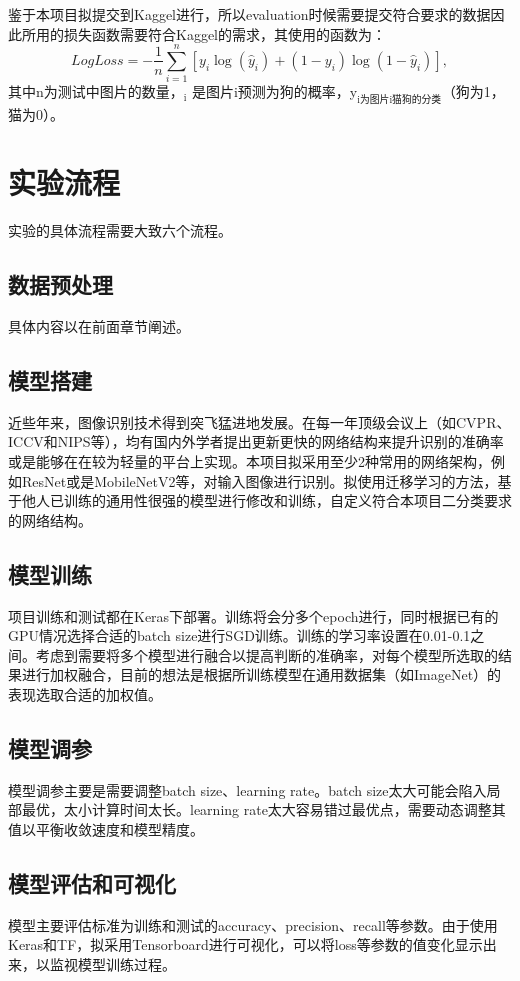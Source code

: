 \documentclass[a4paper,11pt]{article}
\begin{document}
鉴于本项目拟提交到Kaggel进行，所以evaluation时候需要提交符合要求的数据因此所用的损失函数需要符合Kaggel的需求，其使用的函数为：
\begin{equation}
\label{eq:kaggelE}
LogLoss = -\frac{1}{n}\sum_{i=1}^{n}[y_i\log{(\hat{y}_i)}+(1-y_i)\log{(1-\hat{y}_i)}],
\end{equation}
其中n为测试中图片的数量，\(_{\text{i}}\) 是图片i预测为狗的概率，y\(_{\text{i为图片i猫狗的分类}}\)（狗为1，猫为0）。

\section{实验流程}
\label{sec:orgd7a83e8}
实验的具体流程需要大致六个流程。
\subsection{数据预处理}
\label{sec:org98086fe}
具体内容以在前面章节阐述。
\subsection{模型搭建}
\label{sec:orga35ff75}
近些年来，图像识别技术得到突飞猛进地发展。在每一年顶级会议上（如CVPR、ICCV和NIPS等），均有国内外学者提出更新更快的网络结构来提升识别的准确率或是能够在在较为轻量的平台上实现。本项目拟采用至少2种常用的网络架构，例如ResNet或是MobileNetV2等，对输入图像进行识别。拟使用迁移学习的方法，基于他人已训练的通用性很强的模型进行修改和训练，自定义符合本项目二分类要求的网络结构。
\subsection{模型训练}
\label{sec:orga912f23}
项目训练和测试都在Keras下部署。训练将会分多个epoch进行，同时根据已有的GPU情况选择合适的batch size进行SGD训练。训练的学习率设置在0.01-0.1之间。考虑到需要将多个模型进行融合以提高判断的准确率，对每个模型所选取的结果进行加权融合，目前的想法是根据所训练模型在通用数据集（如ImageNet）的表现选取合适的加权值。
\subsection{模型调参}
\label{sec:org6d2ebe4}
模型调参主要是需要调整batch size、learning rate。batch size太大可能会陷入局部最优，太小计算时间太长。learning rate太大容易错过最优点，需要动态调整其值以平衡收敛速度和模型精度。
\subsection{模型评估和可视化}
\label{sec:org4778596}
模型主要评估标准为训练和测试的accuracy、precision、recall等参数。由于使用Keras和TF，拟采用Tensorboard进行可视化，可以将loss等参数的值变化显示出来，以监视模型训练过程。






\end{document}
